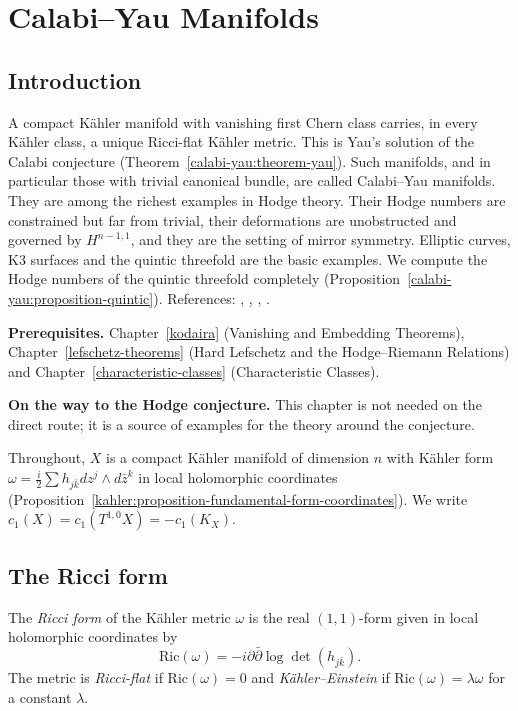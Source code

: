 \chapter{Calabi--Yau Manifolds}\label{calabi-yau}

\section{Introduction}\label{calabi-yau:section-introduction}

A compact K\"ahler manifold with vanishing first Chern class carries, in every K\"ahler class, a unique Ricci-flat K\"ahler metric. This is Yau's solution of
the Calabi conjecture (Theorem~\ref{calabi-yau:theorem-yau}). Such manifolds, and in particular those with trivial canonical bundle, are called Calabi--Yau
manifolds. They are among the richest examples in Hodge theory. Their Hodge numbers are constrained but far from trivial, their deformations are unobstructed
and governed by $H^{n-1,1}$, and they are the setting of mirror symmetry. Elliptic curves, K3 surfaces and the quintic threefold are the basic examples. We
compute the Hodge numbers of the quintic threefold completely (Proposition~\ref{calabi-yau:proposition-quintic}). References: \cite{gross-huybrechts-joyce},
\cite[Chapter 6]{joyce-special-holonomy}, \cite{yau-1978}, \cite{beauville-1983}.

\noindent\textbf{Prerequisites.} Chapter~\ref{kodaira} (Vanishing and Embedding Theorems), Chapter~\ref{lefschetz-theorems} (Hard Lefschetz and the
Hodge--Riemann Relations) and Chapter~\ref{characteristic-classes} (Characteristic Classes).

\noindent\textbf{On the way to the Hodge conjecture.} This chapter is not needed on the direct route; it is a source of examples for the theory around the conjecture.

Throughout, $X$ is a compact K\"ahler manifold of dimension $n$ with K\"ahler form $\omega = \frac{i}{2}\sum h_{j\bar k}dz^j \wedge d\bar z^k$ in local holomorphic
coordinates (Proposition~\ref{kahler:proposition-fundamental-form-coordinates}). We write $c_1(X) = c_1(T^{1,0}X) = -c_1(K_X)$.

\section{The Ricci form}\label{calabi-yau:section-ricci}

\begin{definition}\label{calabi-yau:definition-ricci-form}
The \emph{Ricci form} of the K\"ahler metric $\omega$ is the real $(1,1)$-form given in local holomorphic coordinates by
\[
\mathrm{Ric}(\omega) = -i\partial\bar\partial\log\det(h_{j\bar k}) .
\]
The metric is \emph{Ricci-flat} if $\mathrm{Ric}(\omega) = 0$ and \emph{K\"ahler--Einstein} if $\mathrm{Ric}(\omega) = \lambda\omega$ for a constant $\lambda$.
\end{definition}

